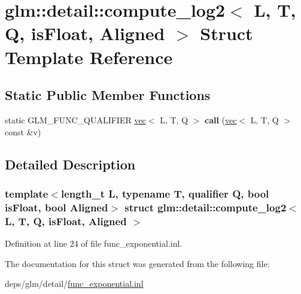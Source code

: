 \hypertarget{structglm_1_1detail_1_1compute__log2}{}\section{glm\+:\+:detail\+:\+:compute\+\_\+log2$<$ L, T, Q, is\+Float, Aligned $>$ Struct Template Reference}
\label{structglm_1_1detail_1_1compute__log2}
\subsection*{Static Public Member Functions}
\begin{DoxyCompactItemize}
\item 
\mbox{\label{structglm_1_1detail_1_1compute__log2_acd539eb6855938b3b7b7f10573baff18}} 
static G\+L\+M\+\_\+\+F\+U\+N\+C\+\_\+\+Q\+U\+A\+L\+I\+F\+I\+ER \hyperlink{structglm_1_1vec}{vec}$<$ L, T, Q $>$ {\bfseries call} (\hyperlink{structglm_1_1vec}{vec}$<$ L, T, Q $>$ const \&v)
\end{DoxyCompactItemize}


\subsection{Detailed Description}
\subsubsection*{template$<$length\+\_\+t L, typename T, qualifier Q, bool is\+Float, bool Aligned$>$\newline
struct glm\+::detail\+::compute\+\_\+log2$<$ L, T, Q, is\+Float, Aligned $>$}



Definition at line 24 of file func\+\_\+exponential.\+inl.



The documentation for this struct was generated from the following file\+:\begin{DoxyCompactItemize}
\item 
deps/glm/detail/\hyperlink{func__exponential_8inl}{func\+\_\+exponential.\+inl}\end{DoxyCompactItemize}
